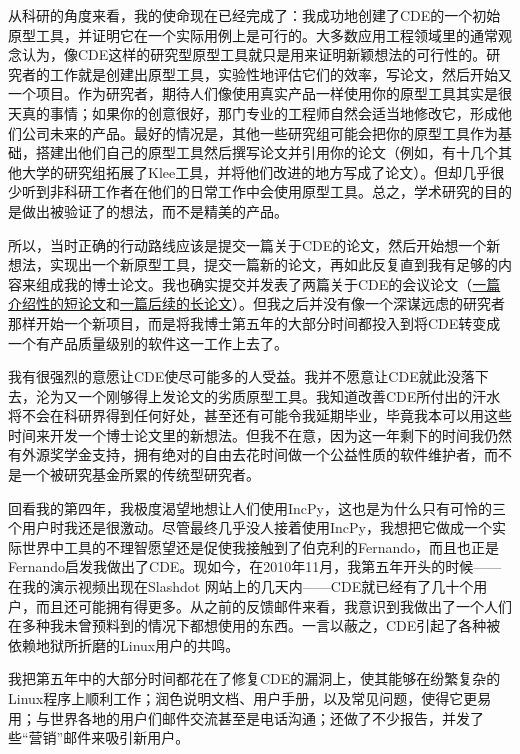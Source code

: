 \documentclass[letter,12pt]{book}
\begin{document}
\begin{CJK}{UTF8}{gbsn}
\breakline

从科研的角度来看，我的使命现在已经完成了：我成功地创建了CDE的一个初始原型工具，并证明它在一个实际用例上是可行的。大多数应用工程领域里的通常观念认为，像CDE这样的研究型原型工具就只是用来证明新颖想法的可行性的。研究者的工作就是创建出原型工具，实验性地评估它们的效率，写论文，然后开始又一个项目。作为研究者，期待人们像使用真实产品一样使用你的原型工具其实是很天真的事情；如果你的创意很好，那门专业的工程师自然会适当地修改它，形成他们公司未来的产品。最好的情况是，其他一些研究组可能会把你的原型工具作为基础，搭建出他们自己的原型工具然后撰写论文并引用你的论文（例如，有十几个其他大学的研究组拓展了Klee工具，并将他们改进的地方写成了论文）。但却几乎很少听到非科研工作者在他们的日常工作中会使用原型工具。总之，学术研究的目的是做出被验证了的想法，而不是精美的产品。

所以，当时正确的行动路线应该是提交一篇关于CDE的论文，然后开始想一个新想法，实现出一个新原型工具，提交一篇新的论文，再如此反复直到我有足够的内容来组成我的博士论文。我也确实提交并发表了两篇关于CDE的会议论文（\href{http://www.pgbovine.net/projects/pubs/guo_usenix11_camera_ready.pdf}{一篇介绍性的短论文}和\href{http://www.pgbovine.net/projects/pubs/cde_LISA.pdf}{一篇后续的长论文}）。但我之后并没有像一个深谋远虑的研究者那样开始一个新项目，而是将我博士第五年的大部分时间都投入到将CDE转变成一个有产品质量级别的软件这一工作上去了。

我有很强烈的意愿让CDE使尽可能多的人受益。我并不愿意让CDE就此没落下去，沦为又一个刚够得上发论文的劣质原型工具。我知道改善CDE所付出的汗水将不会在科研界得到任何好处，甚至还有可能令我延期毕业，毕竟我本可以用这些时间来开发一个博士论文里的新想法。但我不在意，因为这一年剩下的时间我仍然有外源奖学金支持，拥有绝对的自由去花时间做一个公益性质的软件维护者，而不是一个被研究基金所累的传统型研究者。

回看我的第四年，我极度渴望地想让人们使用IncPy，这也是为什么只有可怜的三个用户时我还是很激动。尽管最终几乎没人接着使用IncPy，我想把它做成一个实际世界中工具的不理智愿望还是促使我接触到了伯克利的Fernando，而且也正是Fernando启发我做出了CDE。现如今，在2010年11月，我第五年开头的时候——在我的演示视频出现在Slashdot 网站上的几天内——CDE就已经有了几十个用户，而且还可能拥有得更多。从之前的反馈邮件来看，我意识到我做出了一个人们在多种我未曾预料到的情况下都想使用的东西。一言以蔽之，CDE引起了各种被依赖地狱所折磨的Linux用户的共鸣。

\breakline

我把第五年中的大部分时间都花在了修复CDE的漏洞上，使其能够在纷繁复杂的Linux程序上顺利工作；润色说明文档、用户手册，以及常见问题，使得它更易用；与世界各地的用户们邮件交流甚至是电话沟通；还做了不少报告，并发了些“营销”邮件来吸引新用户。


\end{CJK}
\end{document}
